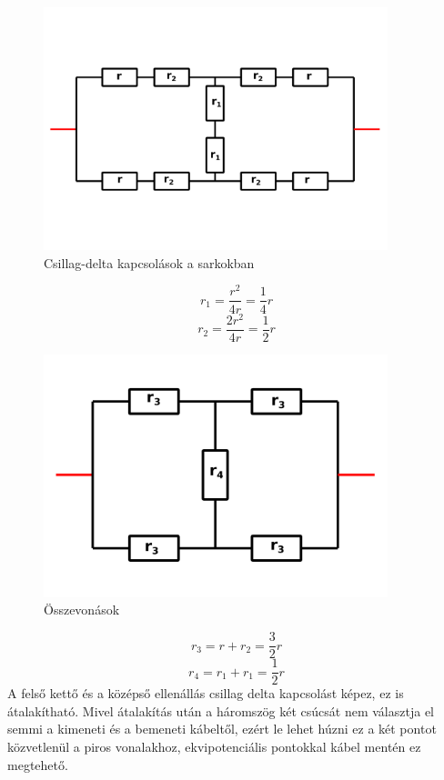 \documentclass[11pt,a4paper,openany,leqno]{article}
\begin{document}
\begin{figure}[h!]
\centering
  \includegraphics[width=100mm,scale=0.5]{grid_2_3.pdf}
  \caption{Csillag-delta kapcsolások a sarkokban}
  \label{}
\end{figure}
$$ r_1 = \frac{r^2}{4r} = \frac{1}{4}r $$
$$ r_2 = \frac{2r^2}{4r} = \frac{1}{2}r $$
\newpage
\begin{figure}[h!]
\centering
  \includegraphics[width=100mm,scale=0.5]{grid_2_4.pdf}
  \caption{Összevonások}
  \label{}
\end{figure}
$$ r_3 = r + r_2 = \frac{3}{2}r $$
$$ r_4 = r_1 + r_1 = \frac{1}{2}r $$
\indent
A felső kettő és a középső ellenállás csillag delta kapcsolást képez, ez is átalakítható. Mivel átalakítás után a háromszög két csúcsát nem választja el semmi a kimeneti és a bemeneti kábeltől, ezért le lehet húzni ez a két pontot közvetlenül a piros vonalakhoz, ekvipotenciális pontokkal kábel mentén ez megtehető.\\
\end{document}
